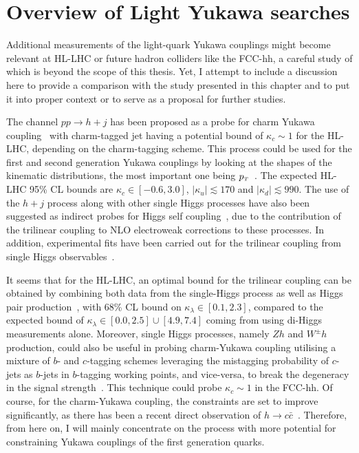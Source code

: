 \section{Overview of Light Yukawa searches \label{sec:comparetoothers}}
\par Additional measurements of the light-quark Yukawa couplings might become relevant at HL-LHC or future hadron colliders like the FCC-hh, a careful study of which is beyond the scope of this thesis. Yet, I attempt to include a discussion here to provide a comparison with the study presented in this chapter and to put it into proper context or to serve as a proposal for further studies.
\par The channel $pp \to h +j $ has been proposed as a probe for charm Yukawa coupling~\cite{Brivio:2015fxa} with charm-tagged jet having a potential bound of $\kappa_c\sim 1$ for the HL-LHC, depending on the charm-tagging scheme. This process could be used for the first and second generation Yukawa couplings by looking at the shapes of the kinematic distributions, the most important one being  $p_{\scriptscriptstyle T}$~\cite{Soreq:2016rae,Bishara:2016jga, Bonner:2016sdg}. The expected HL-LHC 95\% CL bounds are $\kappa_c \in [-0.6,3.0]$, $|\kappa_u |\lesssim 170 $ and $|\kappa_d| \lesssim 990$. The use of the $h+j$ process along with other single Higgs processes have also been suggested as indirect probes for Higgs self coupling~\cite{McCullough:2013rea,Gorbahn:2016uoy,Bizon:2016wgr,Degrassi:2016wml,Maltoni:2017ims,Degrassi:2021uik}, due to the contribution of the trilinear coupling to NLO electroweak corrections to these processes. In addition, experimental fits have been carried out for the trilinear coupling from single Higgs observables~\cite{CMS:2018rig,ATLAS:2019pbo}. 

\par It seems that for the HL-LHC, an optimal bound for the trilinear coupling can be obtained by combining both  data from the single-Higgs process as well as Higgs pair production~\cite{DiVita:2017eyz}, with 68\% CL bound on $\kappa_\lambda \in[0.1,2.3]$, compared to the expected bound of $\kappa_\lambda \in [0.0,2.5] \cup [4.9,7.4]$ coming from using di-Higgs measurements alone. Moreover, single Higgs processes, namely $Zh$ and $ W^\pm h$ production, could also be useful in probing charm-Yukawa coupling utilising a mixture of $b$- and $c$-tagging schemes leveraging the mistagging probability of $c$-jets as $b$-jets in $b$-tagging working points, and vice-versa, to break the degeneracy in the signal strength~\cite{Perez:2015lra}. This technique could probe $\kappa_c \sim 1$ in the FCC-hh. Of course, for the charm-Yukawa coupling, the constraints are set to improve significantly, as there has been a recent direct observation of $h\to c \bar c$~\cite{ATLAS-CONF-2021-021}. Therefore, from here on, I will mainly concentrate on the process with more potential for constraining Yukawa couplings of the first generation quarks. 

